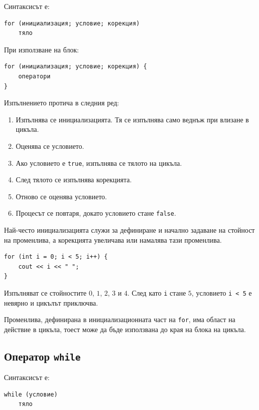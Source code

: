 Синтаксисът е:

\begin{verbatim}
for (инициализация; условие; корекция)
    тяло
\end{verbatim}

При използване на блок:

\begin{verbatim}
for (инициализация; условие; корекция) {
    оператори
}
\end{verbatim}

Изпълнението протича в следния ред:

\begin{enumerate}
\item Изпълнява се инициализацията. Тя се изпълнява само веднъж при влизане в цикъла.
\item Оценява се условието.
\item Ако условието е \texttt{true}, изпълнява се тялото на цикъла.
\item След тялото се изпълнява корекцията.
\item Отново се оценява условието.
\item Процесът се повтаря, докато условието стане \texttt{false}.
\end{enumerate}

Най-често инициализацията служи за дефиниране и начално задаване на стойност на променлива, а корекцията увеличава или намалява тази променлива.

\begin{example}
\begin{verbatim}
for (int i = 0; i < 5; i++) {
    cout << i << " ";
}
\end{verbatim}

Изпълняват се стойностите $0$, $1$, $2$, $3$ и $4$. След като \texttt{i} стане $5$, условието \texttt{i < 5} е невярно и цикълът приключва.
\end{example}

Променлива, дефинирана в инициализационната част на \texttt{for}, има област на действие в цикъла, тоест може да бъде използвана до края на блока на цикъла.

\subsection{Оператор \texttt{while}}\label{s:14.4.2}

Синтаксисът е:

\begin{verbatim}
while (условие)
    тяло
\end{verbatim}

